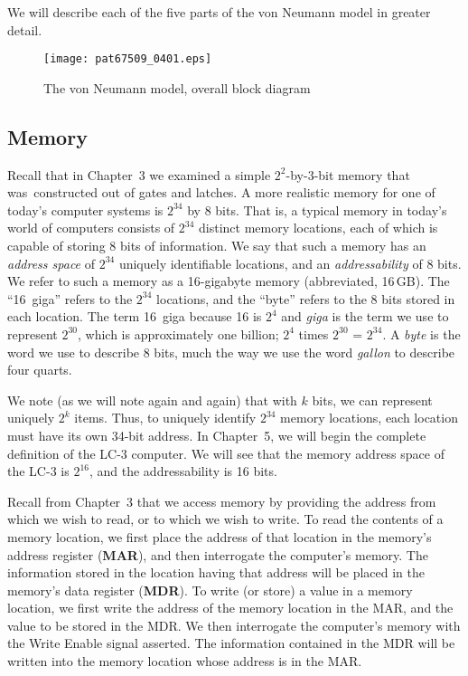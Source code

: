 \documentclass{patt}
\begin{document}


We will describe each of the five parts of the von Neumann model in greater
detail.

\begin{figure}
\vspace{2pt}
\centerline{\texttt{[image: pat67509\_0401.eps]}}
\caption{The von Neumann model, overall block diagram}
\label{fig:vonneumann}
\vspace{-2pt}
\end{figure}


\subsection{Memory}

Recall that in Chapter~3 we examined a simple $2^2$-by-3-bit
memory that was~constructed out of gates and latches. A more realistic
memory for one of today's computer systems is $2^{34}$ by 8 bits.  That is, a
typical memory in today's world of computers consists of $2^{34}$ distinct
memory locations, each of which is capable of storing 8 bits of information.
We say that such a memory has an {\em address space} of $2^{34}$ uniquely
identifiable locations, and an {\em addressability} of 8 bits.  We refer
to such a memory as a 16-gigabyte memory (abbreviated, 16\,GB).
The ``16~giga'' refers to the $2^{34}$ locations, and the ``byte''
refers to the 8 bits stored in each location. The term 16~giga because
16 is $2^{4}$ and {\em giga} is the term we use to represent $2^{30}$, which is
approximately one billion; $2^{4}$ times $2^{30}$ = $2^{34}$.  A {\em byte} is the word we use to describe 8 bits, much the
way we use the word {\em gallon} to describe four quarts.

We note (as we will note again and again) that with $k$ bits, we can represent
uniquely $2^k$ items.  Thus, to uniquely identify $2^{34}$ memory locations, 
each location must have its own 34-bit address.  In Chapter~5, we will begin 
the complete definition of the LC-3
computer. We will see that the memory address space of the LC-3 is $2^{16}$,
and the addressability is 16 bits.

Recall from Chapter~3 that we access memory by providing the address from
which we wish to read, or to which we wish to write.  To read the contents
of a memory location, we first place the address of that location in the
memory's address register ({\bf MAR}), and then interrogate the computer's
memory.  The \nobreak information stored in the location having that address 
will be placed in the memory's data register ({\bf MDR}).  To write (or store)
a value in a memory location, we first write the address of the memory
location in the MAR, and the value to be stored in the MDR.  We then
interrogate the computer's memory with the Write Enable signal
asserted.  The information contained in the MDR will be written into
the memory location whose address is in the MAR.
\end{document}
